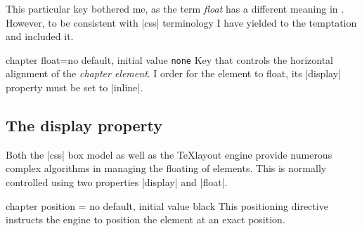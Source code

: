\begin{decription}
This particular key bothered me, as the term \emph{float} has a different meaning in \latexe. However, to
be consistent with |css| terminology I have yielded to the temptation and included it.

\begin{docKey}[]{chapter float}{=}{no default, initial value \texttt{none}}
Key that controls the horizontal alignment of the \emph{chapter element}. I order for the
element to float, its |display| property must be set to |inline|.
\end{docKey}



\subsection{The display property}

Both the |css| box model as well as the \TeX layout engine provide numerous complex algorithms in managing the floating of elements. This is normally controlled using two properties |display| and |float|.


\makeatletter

\begin{docKey}[phd]{chapter position}{ = }{no default, initial value black}
This positioning directive instructs the engine to position the element at an exact position.
\end{docKey}



\dotfill{}
\makeatother


\end{decription}
